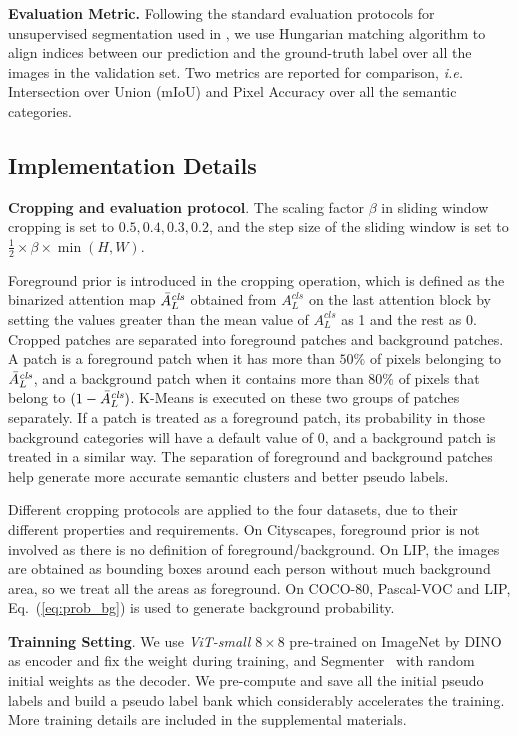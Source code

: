 \documentclass[runningheads]{llncs}
\def\ie{\emph{i.e. }}
\newcommand{\PAR}[1]{\smallskip \noindent \textbf{#1}}
\renewcommand{\eqref}[1]{Eq.~(\ref{#1})}
\begin{document}
\PAR{Evaluation Metric.} Following the standard evaluation protocols for unsupervised segmentation used in \cite{IIC,PiCIE,MaskContrast}, we use Hungarian matching algorithm to align indices between our prediction and the ground-truth label over all the images in the validation set. Two metrics are reported for comparison, \ie Intersection over Union (mIoU) and Pixel Accuracy over all the semantic categories.


\subsection{Implementation Details} 

\PAR{Cropping and evaluation protocol}. The scaling factor $\beta$ in sliding window cropping is set to $0.5, 0.4, 0.3, 0.2$, and the step size of the sliding window is set to $\frac{1}{2} \times \beta \times \min(H, W)$. 

Foreground prior is introduced in the cropping operation, which is defined as the binarized attention map $\Bar{A}_L^{\textit{cls}}$ obtained from $A_L^{\textit{cls}}$ on the last attention block by setting the values greater than the mean value of $A_L^{\textit{cls}}$ as 1 and the rest as 0. Cropped patches are separated into foreground patches and background patches. A patch is a foreground patch when it has more than $50\%$ of pixels belonging to $\Bar{A}_L^{\textit{cls}}$, and a background patch when it contains more than $80\%$ of pixels that belong to $(1 - \Bar{A}_L^{\textit{cls}})$. K-Means is executed on these two groups of patches separately. If a patch is treated as a foreground patch, its probability in those background categories will have a default value of 0, and a background patch is treated in a similar way.
The separation of foreground and background patches help generate more accurate semantic clusters and better pseudo labels. 

Different cropping protocols are applied to the four datasets, due to their different properties and requirements. On Cityscapes, foreground prior is not involved as there is no definition of foreground/background. On LIP, the images are obtained as bounding boxes around each person without much background area, so we treat all the areas as foreground. On COCO-80, Pascal-VOC and LIP, \eqref{eq:prob_bg} is used to generate background probability. 


\PAR{Trainning Setting}. We use \textit{ViT-small} $8 \times 8$ pre-trained on ImageNet by DINO\cite{DINO} as encoder and fix the weight during training, and Segmenter~\cite{strudel2021segmenter} with random initial weights as the decoder. We pre-compute and save all the initial pseudo labels and build a pseudo label bank which considerably accelerates the training. More training details are included in the supplemental materials.
\end{document}
